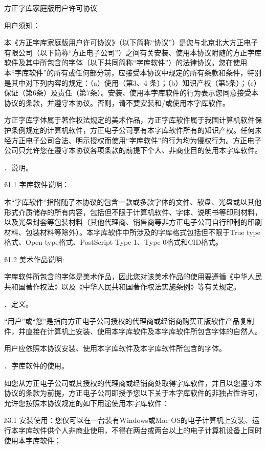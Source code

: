 \centerline{\5 方正字库家庭版用户许可协议}
\s 用户须知：\par
\ssss 本《方正字库家庭版用户许可协议》（以下简称“协议”）是您与北京北大方正电子有限公司（以下简称“方正电子公司”）之间有关安装、使用本协议附随的方正字库软件及其中所包含的字体（以下共同简称“字库软件”）的法律协议。您在使用本“字库软件”的所有或任何部分前，应接受本协议中规定的所有条款和条件，特别是其中对下列内容的规定：（a）使用（第3、4 条）；（b）知识产权（第5条）；（c）保证（第6条）及责任（第7条）。安装、使用本字库软件的行为表示您同意接受本协议的条款，并遵守本协议。否则，请不要安装和/或使用本字库软件。\par
\ssss 方正字库字体属于著作权法规定的美术作品，方正字库软件属于我国计算机软件保护条例规定的计算机软件，方正电子公司享有本字库软件所有的知识产权。任何未经方正电子公司合法、明示授权而使用“字库软件”的行为均为侵权行为。方正电子公司只允许您在遵守本协议各项条款的前提下个人、非商业目的使用本字库软件。\par
{}．说明。\par
\ss 1.1 字库软件说明：\par
\ssss 本“字库软件”指附随了本协议的包含一款或多款字体的文件、软盘、光盘或以其他形式介质储存的所有内容，包括但不限于计算机软件、字体、说明书等印刷材料，以及光盘封套等包装材料（其他代理商、销售商等非方正电子公司自行印制的印刷材料、包装材料等除外）。本字库软件中所涉及的字库格式包括但不限于True type格式、Open type格式、PostScript Type 1、Type 0格式和CID格式。\par
\ss 1.2 美术作品说明:\par
\ssss 字库软件所包含的字体是美术作品，因此您对该美术作品的使用要遵循《中华人民共和国著作权法》以及《中华人民共和国著作权法实施条例》等有关规定。\par
{}．定义。\par
\ssss “用户”或“您”是指向方正电子公司授权的代理商或经销商购买正版软件产品复制件，并直接在计算机上安装、使用本字库软件及本字库软件所包含字体的自然人。\par
\ssss 用户应依照本协议安装、使用本字库软件及本字库软件所包含的字体。\par
{}．字库软件的使用。\par
\ssss 如您从方正电子公司或其授权的代理商或经销商处取得字库软件，并且以您遵守本协议的条款为前提，方正电子公司即授予您以下关于本字库软件的非独占性许可，允许您按照本协议规定的如下用途使用本字库软件：\par
\ss 3.1 安装使用：您仅可以在一台装有Windows或Mac OS的电子计算机上安装、运行本字库软件供个人非商业使用，不得在两台或两台以上的电子计算机设备上同时使用本字库软件；\par
